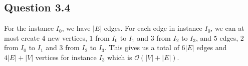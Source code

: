 \documentclass[a4paper]{article}
\newcommand\abs[1]{\left|#1\right|}
\begin{document}
\subsection*{Question 3.4}
For the instance $I_0$, we have $\abs{E}$ edges. For each edge in instance $I_0$, we can at most create 4 new vertices, $1$ from $I_0$ to $I_1$ and $3$ from $I_2$ to $I_3$, and $5$ edges, $2$ from $I_0$ to $I_1$ and $3$ from $I_2$ to $I_3$. This gives us a total of $6\abs{E}$ edges and $4\abs{E}+\abs{V}$ vertices for instance \(I_3\) which is $\mathcal{O}(\abs{V}+\abs{E})$.
\end{document}
